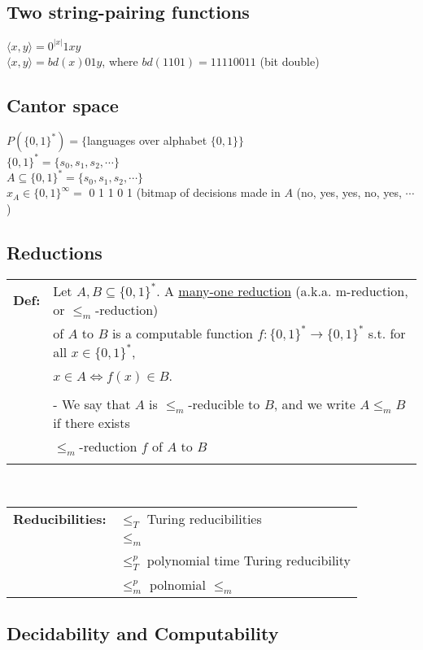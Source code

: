 \documentclass[11pt]{article}
\begin{document}
\subsection{Two string-pairing functions}
$\langle x,y \rangle = 0^{|x|}1xy$ \\
$\langle x,y \rangle = bd(x)01y$, where $bd(1101)=11110011$ (bit double) 

\subsection{Cantor space}
$P(\{0,1\}^*)=\{$languages over alphabet $\{0,1\}\}$ \\
$\{0,1\}^* = \{s_0, s_1, s_2,\cdots\}$ \\
$A \subseteq \{0,1\}^* = \{s_0, s_1, s_2, \cdots\}$ \\
$x_A \in \{0,1\}^{\infty} =$ 0 1 1 0 1 (bitmap of decisions made in $A$ (no, yes, yes, no, yes, $\cdots$) \\

\subsection{Reductions}

\begin{tabular}{ll}
{\bf Def:} & Let $A,B\subseteq\{0,1\}^*$. A \underline{many-one reduction} (a.k.a. m-reduction, or $\leqslant_m$-reduction) \\
& of $A$ to $B$ is a computable function $f:\{0,1\}^*\rightarrow\{0,1\}^*$ s.t. for all $x\in\{0,1\}^*$, \\
& $x\in A \Leftrightarrow f(x)\in B$. \\
\\
& - We say that $A$ is $\leqslant_m$-reducible to $B$, and we write $A\leqslant_m B$ if there exists \\
& $\leqslant_m$-reduction $f$ of $A$ to $B$ \\
\\
\end{tabular}
\\
\begin{tabular}{ll}
{\bf Reducibilities:} & $\leqslant_T$ Turing reducibilities \\
& $\leqslant_m$ \\
& $\leqslant^p_T$ polynomial time Turing reducibility \\
& $\leqslant^p_m$ polnomial $\leqslant_m$
\end{tabular}

\subsection{Decidability and Computability}
\end{document}
